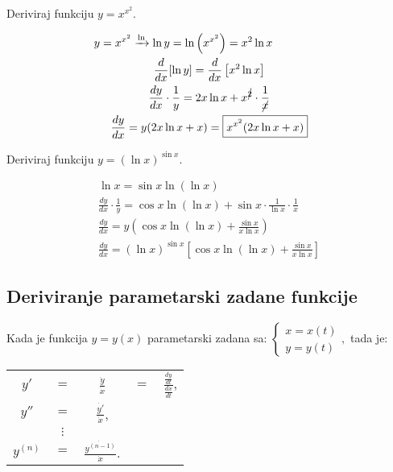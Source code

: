 \begin{multicols}{2}
\begin{example}
    Deriviraj funkciju $y=x^{x^2}$.
\end{example}

\begin{gather*}
    y=x^{x^2} \xrightarrow{\ln} \ln y= \ln \left(x^{x^2}\right) = x^2 \ln x \phantom{y=x^{x^2} \to}\\
    \frac{d}{dx}[\ln y] = \frac{d}{dx} \left[ x^2 \ln x \right]\\
    \frac{dy}{dx}\cdot\frac{1}{y}=2x \ln x + x^{\cancel{2}}\cdot\frac{1}{\cancel{x}}\\
    \frac{dy}{dx} = y (2x\ln x + x) = \boxed{x^{x^2} (2x\ln x + x)}
\end{gather*}

\columnbreak

\begin{example}
    Deriviraj funkciju $y=(\ln x)^{\sin x}$.
\end{example}

\begin{gather*}
    \ln x = \sin x \ln (\ln x)\\
    \frac{dy}{dx}\cdot\frac{1}{y} = \cos x \ln (\ln x) + \sin x \cdot \frac{1}{\ln x} \cdot \frac{1}{x}\\
    \frac{dy}{dx} = y (\cos x \ln (\ln x) + \frac{\sin x}{x \ln x})\\
    \frac{dy}{dx} = \boxed{(\ln x)^{\sin x}\left[\cos x \ln (\ln x) + \frac{\sin x}{x \ln x}\right]}
\end{gather*}

\end{multicols}


\subsection{Deriviranje parametarski zadane funkcije}

Kada je funkcija $y=y(x)$ parametarski zadana sa: $\displaystyle
\begin{cases}
    x = x(t)\\
    y = y(t)
\end{cases},
$ tada je:

\begin{center}
    \begin{tabular}{ccccc}
    $y'$&$=$&$\displaystyle\frac{\dot{y}}{\dot{x}}$&$=$&$\displaystyle\frac{\frac{dy}{dt}}{\frac{dx}{dt}}$,\\
    $y''$&$=$&$\displaystyle\frac{\dot{y'}}{\dot{x}}$,\\
    &$\vdots$&\\
    $y^{(n)}$&$=$&$\displaystyle\frac{\dot{y^{(n-1)}}}{\dot{x}}$.
    \end{tabular}
\end{center}

